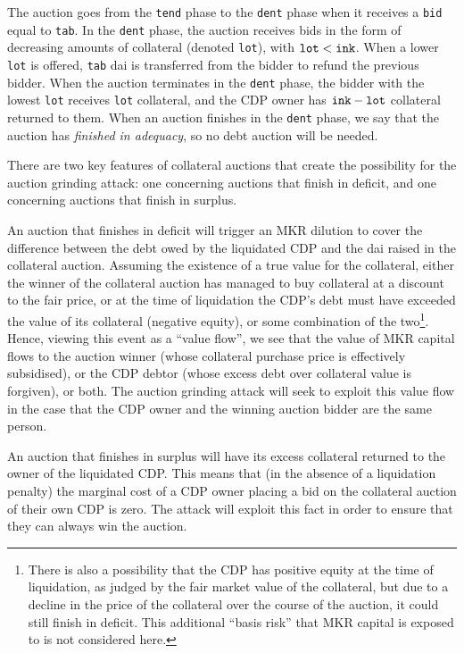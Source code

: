 \documentclass[a4paper,10pt]{article}
\begin{document}
\par The auction goes from the {\tt tend} phase to the {\tt dent} phase when it receives a {\tt bid} equal to {\tt tab}. In the {\tt dent} phase, the auction receives bids in the form of decreasing amounts of collateral (denoted {\tt lot}), with ${\tt lot} < {\tt ink}$. When a lower {\tt lot} is offered, {\tt tab} dai is transferred from the bidder to refund the previous bidder. When the auction terminates in the {\tt dent} phase, the bidder with the lowest {\tt lot} receives {\tt lot} collateral, and the CDP owner has ${\tt ink}-{\tt lot}$ collateral returned to them. When an auction finishes in the {\tt dent} phase, we say that the auction has \emph{finished in adequacy}, so no debt auction will be needed.

\par There are two key features of collateral auctions that create the possibility for the auction grinding attack: one concerning auctions that finish in deficit, and one concerning auctions that finish in surplus.
\par An auction that finishes in deficit will trigger an MKR dilution to cover the difference between the debt owed by the liquidated CDP and the dai raised in the collateral auction. Assuming the existence of a true value for the collateral, either the winner of the collateral auction has managed to buy collateral at a discount to the fair price, or at the time of liquidation the CDP's debt must have exceeded the value of its collateral (negative equity), or some combination of the two\footnote{There is also a possibility that the CDP has positive equity at the time of liquidation, as judged by the fair market value of the collateral, but due to a decline in the price of the collateral over the course of the auction, it could still finish in deficit. This additional ``basis risk'' that MKR capital is exposed to is not considered here.}. Hence, viewing this event as a ``value flow'', we see that the value of MKR capital flows to the auction winner (whose collateral purchase price is effectively subsidised), or the CDP debtor (whose excess debt over collateral value is forgiven), or both. The auction grinding attack will seek to exploit this value flow in the case that the CDP owner and the winning auction bidder are the same person.

\par An auction that finishes in surplus will have its excess collateral returned to the owner of the liquidated CDP. 
This means that (in the absence of a liquidation penalty) the marginal cost of a CDP owner placing a bid on the collateral auction of their own CDP is zero. The attack will exploit this fact in order to ensure that they can always win the auction.
\end{document}
